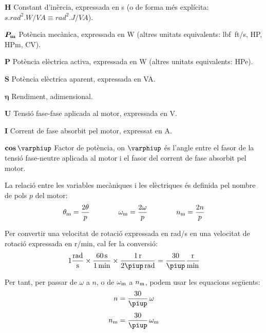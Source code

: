 \begin{list}{}
   \item[$\boldsymbol{H}$] Constant d'inèrcia, expressada en \unit{s} (o de forma més explícita:
   $\unit{s.rad^2.W/VA} \equiv \unit{rad^2.J/VA}$).
   \item[$\boldsymbol{P_\mathrm{m}}$] Potència mecànica, expressada en \unit{W} (altres unitats equivalents: \unit{lbf.ft/s}, \unit{HP},  \unit{HPm}, \unit{CV}).
   \item[$\boldsymbol{P}$] Potència elèctrica activa, expressada en \unit{W} (altres unitats equivalents: \unit{HPe}).
   \item[$\boldsymbol{S}$] Potència elèctrica aparent, expressada en \unit{VA}.
   \item[$\boldsymbol{\eta}$] Rendiment, adimensional.
   \item[$\boldsymbol{U}$] Tensió fase-fase aplicada al motor, expressada en \unit{V}.
   \item[$\boldsymbol{I}$] Corrent de fase absorbit pel motor, expressat en \unit{A}.
   \item[$\boldsymbol{\cos\varphiup}$] Factor de potència, on $\varphiup$ és l'angle entre el fasor de la tensió fase-neutre aplicada al motor i el fasor del corrent de fase absorbit pel motor.
\end{list}

La relació entre les variables mecàniques i les elèctriques és definida pel nombre de pols $p$ del motor:
\begin{equation}\label{eq:vel-ele-mec}
    \theta_\mathrm{m} = \frac{2\theta}{p} \qquad\qquad
    \omega_\mathrm{m} = \frac{2\omega}{p} \qquad\qquad
    n_\mathrm{m} = \frac{2n}{p}
\end{equation}

Per  convertir una velocitat de rotació expressada en \unit{rad/s} en una velocitat de rotació expressada en \unit{r/min}, cal fer la conversió:
\begin{equation}
 1\frac{\unit{rad}}{\unit{s}} \times \frac{\qty{60}{s}}{\qty{1}{min}} \times \frac{\qty{1}{r}}{2\piup\,\unit{rad}} = \frac{30}{\piup}\frac{\unit{r}}{\unit{min}}
 \end{equation}

 Per tant, per passar de $\omega$ a $n$, o de $\omega_\mathrm{m}$ a $n_\mathrm{m}$, podem usar les equacions següents:
\begin{subequations}\index{motors d'inducció!velocitat}
\begin{align}
    n        &= \frac{30}{\piup} \,\omega \\[1ex]
    n\ped{m} &= \frac{30}{\piup} \,\omega\ped{m}
\end{align}
\end{subequations}

